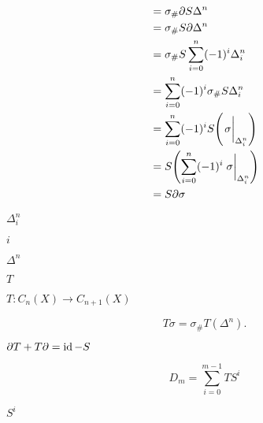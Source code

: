 \documentclass[10pt]{book}
\begin{document}
\begin{mdSnippets}
\begin{mdDisplaySnippet}
\[\begin{aligned}
&= \sigma_\# \partial S \Delta^n \\
&= \sigma_\# S \partial \Delta^n \\
&= \sigma_\# S \sum_{i=0}^n (-1)^i \Delta_i^n \\
&= \sum_{i=0}^n (-1)^i \sigma_\# S \Delta_i^n \\
&= \sum_{i=0}^n (-1)^i S\qty(\eval{\sigma}_{\Delta_i^n}) \\
&= S\qty(\sum_{i=0}^n (-1)^i \eval{\sigma}_{\Delta_i^n}) \\
&= S \partial \sigma
\end{aligned}
\]%
\end{mdDisplaySnippet}%
\begin{mdInlineSnippet}[27552cc6b650caf924e47b257e4a37e4]%
$\Delta_i^n$\end{mdInlineSnippet}%
\begin{mdInlineSnippet}[865c0c0b4ab0e063e5caa3387c1a8741]%
$i$\end{mdInlineSnippet}%
\begin{mdInlineSnippet}[26ab61fa8024f78da62a405a1e574d8f]%
$\Delta^n$\end{mdInlineSnippet}%
\begin{mdInlineSnippet}%
$T$\end{mdInlineSnippet}%
\begin{mdInlineSnippet}[e65abafdab37ab18e9660b92910f9c4c]%
$T: C_n(X) \to C_{n+1}(X)$\end{mdInlineSnippet}%
\begin{mdDisplaySnippet}[68ba3d7b0da661dc7f44821d29930321]%
\[%
T\sigma = \sigma_\# T(\Delta^n).
\]%
\end{mdDisplaySnippet}%
\begin{mdInlineSnippet}%
$\partial T + T \partial = \operatorname{id} - S$\end{mdInlineSnippet}%
\begin{mdDisplaySnippet}[70b2e4d53988d3e6e5dfe2ac377030a4]%
\[%
D_m = \sum_{i=0}^{m-1} TS^i
\]%
\end{mdDisplaySnippet}%
\begin{mdInlineSnippet}[acb3e55fe00e6af9a6d16095f841b683]%
$S^i$\end{mdInlineSnippet}%

\end{mdSnippets}
\end{document}
